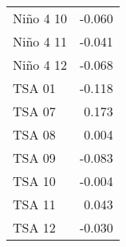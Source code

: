 \begin{tabular}{lr}
Niño 4 10       &           -0.060 \\
Niño 4 11       &           -0.041 \\
Niño 4 12       &           -0.068 \\
TSA 01          &           -0.118 \\
TSA 07          &            0.173 \\
TSA 08          &            0.004 \\
TSA 09          &           -0.083 \\
TSA 10          &           -0.004 \\
TSA 11          &            0.043 \\
TSA 12          &           -0.030 \\
\bottomrule
\end{tabular}
